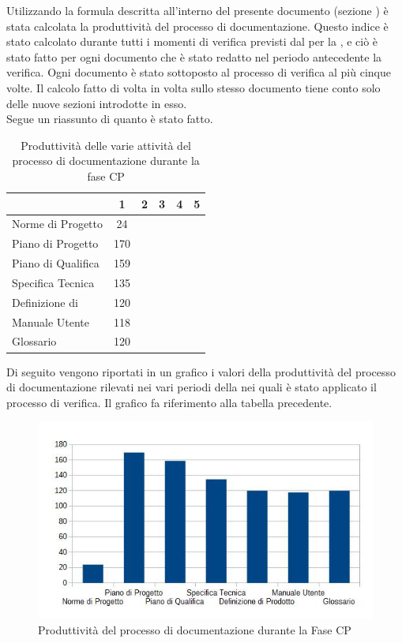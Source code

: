 Utilizzando la formula descritta all'interno del presente documento (sezione ) è stata calcolata la produttività del processo di documentazione. Questo indice è stato calcolato durante tutti i momenti di verifica previsti dal  per la , e ciò è stato fatto per ogni documento che è stato redatto nel periodo antecedente la verifica. Ogni documento è stato sottoposto al processo di verifica al più cinque volte. Il calcolo fatto di volta in volta sullo stesso documento tiene conto solo delle nuove sezioni introdotte in esso.\\
Segue un riassunto di quanto è stato fatto.
\begin{table}[H]
      \centering
		\begin{tabu}{| l | c | c | c | c | c |}
		\hline
		&1	&2	&3	&4	&5	\\ \hline
		Norme di Progetto	& 24 &	&	&	& \\ \hline
		Piano di Progetto	& 170 &	&	&	& \\ \hline
		Piano di Qualifica	& 159	&	&	&	&\\ \hline
		Specifica Tecnica & 135 & & & & \\ \hline
		Definizione di  & 120 &	 	&	&  	&\\ \hline
		Manuale Utente & 118	&	&	&	& \\ \hline
		Glossario & 120 &  & & &\\ \hline
		\end{tabu}
		\caption{Produttività delle varie attività del processo di documentazione durante la fase CP}
\end{table}
Di seguito vengono riportati in un grafico i valori della produttività del processo di documentazione rilevati nei vari periodi della  nei quali è stato applicato il processo di verifica. Il grafico fa riferimento alla tabella precedente.\\
\begin{figure}[H]
	\centering
		\includegraphics[width=12cm]{PianoDiQualifica/Pics/ProduttivitaDocumentazioneFaseCP.jpg}
	\caption{Produttività del processo di documentazione durante la Fase CP}
\end{figure}
